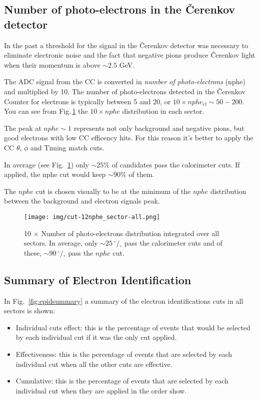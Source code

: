 
\clearpage\newpage

\subsection{Number of photo-electrons in the \v Cerenkov detector}
\label{sec:cc_cut}
In the past a threshold for the signal in the \v Cerenkov detector was necessary to eliminate
electronic noise and the fact that negative pions produce \v Cerenkov light when 
their momentum is above $\sim 2.5$ GeV.

The ADC signal from the CC is converted in 
{\it number of photo-electrons} (nphe) and
multiplied by 10. The number of photo-electrons detected in the \v Cerenkov
Counter for electrons is typically between 5 and 20, or $10\times nphe_{el} \sim 50-200$.
You can see from Fig.\,\ref{fig:cccut_alls} the $10\times nphe$
distribution in each sector.

The peak at $nphe \sim 1$ represents not only background and
negative pions, but good electrons with low CC efficency hits. For this reason
it's better to apply the CC $\theta$, $\phi$ and Timing match cuts.

In average (see Fig.~\ref{fig:cccut_alls}) only $\sim 25\%$ of candidates pass the calorimeter cuts. 
If applied, the nphe cut would keep $\sim 90\%$ of them.

The $nphe$ cut is chosen visually to be at the minimum
of the $nphe$ distribution between the background and electron signals peak.


\begin{figure}[ht]
  \centering
		\texttt{[image: img/cut-12nphe\_sector-all.png]}
		\caption{10 $\times$ Number of photo-electrons distribution integrated over all sectors.
               In average, only $\sim 25 \,^{\circ\!\!}/\!_\circ$ pass the calorimeter cuts and of these, 
               $\sim 90 \,^{\circ\!\!}/\!_\circ$ pass the $nphe$ cut.}
 		\label{fig:cccut_alls}
\end{figure}
		




\subsection{Summary of Electron Identification }
In Fig.~\ref{fig:epidsummary} a summary of the electron identifications cuts in all sectors is shown:

\begin{itemize}
	\item Individual cuts effect: this is the percentage of events that would be selected by each
	individual cut if it was the only cut applied.
	\item Effectiveness: this is the percentage of events that are selected by each individual cut when
	all the other cuts are effective.
	\item Cumulative: this is the percentage of events that are selected by each individual cut when
	they are applied in the order show.
\end{itemize}


